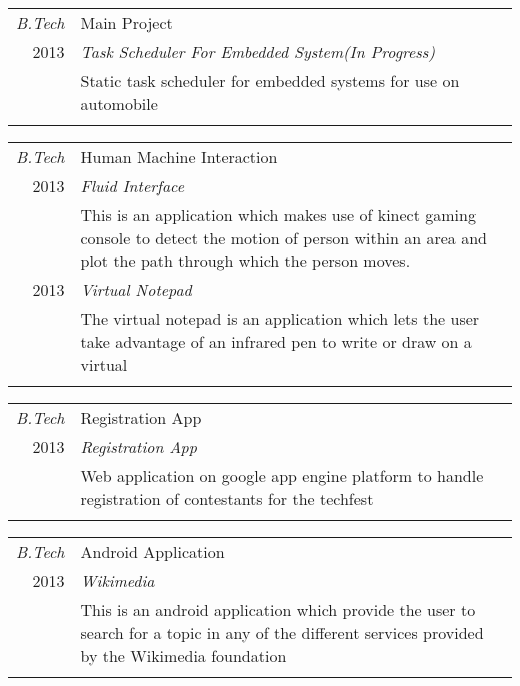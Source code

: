 \documentclass[a4paper]{article}
\begin{document}
\begin{tabular}{r|p{15cm}}
\emph{B.Tech} & Main Project \\
\textsc{2013} & \emph{Task Scheduler For Embedded System(In Progress)} \\
& \normalsize{Static task scheduler for embedded systems for use on automobile
}\\

\multicolumn{2}{c}{}\ %
\end{tabular}

\begin{tabular}{r|p{15cm}}
\emph{B.Tech} & Human Machine Interaction \\
\textsc{2013} & \emph{Fluid Interface} \\
& \normalsize{This is an application which makes use of kinect gaming console to detect the motion of person within an area and plot the path through which the person moves.
}\\

\textsc{2013} & \emph{Virtual Notepad} \\
& \normalsize{The virtual notepad is an application which lets the user take advantage of an infrared pen to write or draw on a virtual
}\\


\multicolumn{2}{c}{}\ %
\end{tabular}

\begin{tabular}{r|p{15cm}}
\emph{B.Tech} & Registration App \\
\textsc{2013} & \emph{Registration App} \\
& \normalsize{Web application on google app engine platform to handle registration of contestants for the techfest
}\\

\multicolumn{2}{c}{}\ %
\end{tabular}

\begin{tabular}{r|p{15cm}}
\emph{B.Tech} & Android Application \\
\textsc{2013} & \emph{Wikimedia } \\
& \normalsize {This is an android application which provide the user to search for a topic in any of the different services provided by the Wikimedia foundation
}\\ 

\multicolumn{2}{c}{}\ %
\end{tabular}
\end{document}
